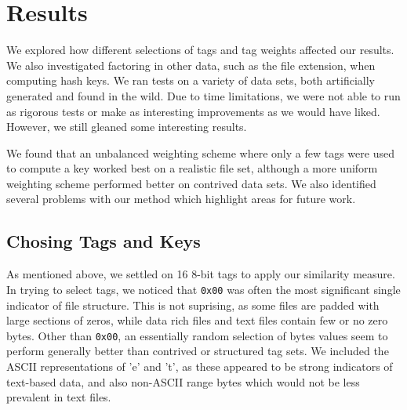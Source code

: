 \documentclass[10pt, twocolumn]{article}
\begin{document}
\section{Results}

We explored how different selections of tags and tag weights affected our results. We also investigated factoring in other data, such as the file extension, when computing hash keys.  We ran tests on a variety of data sets, both artificially generated and found in the wild. Due to time limitations, we were not able to run as rigorous tests or make as interesting improvements as we would have liked. However, we still gleaned some interesting results.

We found that an unbalanced weighting scheme where only a few tags were used to compute a key worked best on a realistic file set, although a more uniform weighting scheme performed better on contrived data sets. We also identified several problems with our method which highlight areas for future work.

\subsection{Chosing Tags and Keys}

As mentioned above, we settled on 16 8-bit tags to apply our similarity measure.  In trying to select tags, we noticed that {\tt 0x00} was often the most significant single indicator of file structure.  This is not suprising, as some files are padded with large sections of zeros, while data rich files and text files contain few or no zero bytes.  Other than {\tt 0x00}, an essentially random selection of bytes values seem to perform generally better than contrived or structured tag sets.  We included the ASCII representations of 'e' and 't', as these appeared to be strong indicators of text-based data, and also non-ASCII range bytes which would not be less prevalent in text files.
\end{document}
